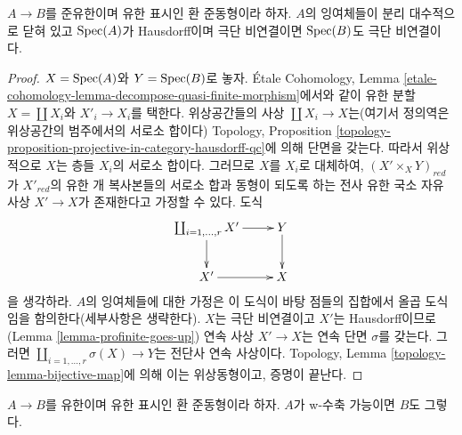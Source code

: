 \begin{lemma}
\label{lemma-finite-finitely-presented-over-extremally-disconnected}
$A \to B$를 준유한이며 유한 표시인 환 준동형이라 하자.
$A$의 잉여체들이 분리 대수적으로 닫혀 있고 $\mathop{\mathrm{Spec}}(A)$가 Hausdorff이며
극단 비연결이면 $\mathop{\mathrm{Spec}}(B)$도 극단 비연결이다.
\end{lemma}

\begin{proof}
$X = \mathop{\mathrm{Spec}}(A)$와 $Y = \mathop{\mathrm{Spec}}(B)$로 놓자. \'Etale Cohomology, Lemma
\ref{etale-cohomology-lemma-decompose-quasi-finite-morphism}에서와 같이
유한 분할 $X = \coprod X_i$와 $X'_i \to X_i$를 택한다.
위상공간들의 사상 $\coprod X_i \to X$는(여기서 정의역은 위상공간의
범주에서의 서로소 합이다) Topology, Proposition
\ref{topology-proposition-projective-in-category-hausdorff-qc}에 의해
단면을 갖는다. 따라서 위상적으로 $X$는 층들 $X_i$의 서로소 합이다.
그러므로 $X$를 $X_i$로 대체하여, $(X' \times_X Y)_{red}$가
$X'_{red}$의 유한 개 복사본들의 서로소 합과 동형이 되도록 하는
전사 유한 국소 자유 사상 $X' \to X$가 존재한다고 가정할 수 있다.
도식
$$
\xymatrix{
\coprod_{i = 1, \ldots, r} X' \ar[r] \ar[d] & Y \ar[d] \\
X' \ar[r] & X
}
$$
을 생각하라. $A$의 잉여체들에 대한 가정은 이 도식이 바탕 점들의
집합에서 올곱 도식임을 함의한다(세부사항은 생략한다).
$X$는 극단 비연결이고 $X'$는 Hausdorff이므로
(Lemma \ref{lemma-profinite-goes-up}) 연속 사상 $X' \to X$는
연속 단면 $\sigma$를 갖는다. 그러면
$\coprod_{i = 1, \ldots, r} \sigma(X) \to Y$는 전단사 연속 사상이다.
Topology, Lemma \ref{topology-lemma-bijective-map}에 의해 이는
위상동형이고, 증명이 끝난다.
\end{proof}

\begin{lemma}
\label{lemma-finite-finitely-presented-over-w-contractible}
$A \to B$를 유한이며 유한 표시인 환 준동형이라 하자.
$A$가 w-수축 가능이면 $B$도 그렇다.
\end{lemma}

